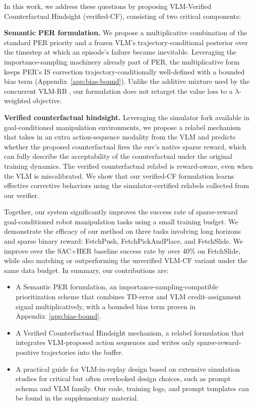 \documentclass{article}
\begin{document}
In this work, we address these questions by proposing VLM-Verified
Counterfactual Hindsight (verified-CF), consisting of two critical
components:

\textbf{Semantic PER formulation.}
We propose a multiplicative combination of the standard PER priority
and a frozen VLM's trajectory-conditional posterior over the
timestep at which an episode's failure became inevitable. Leveraging
the importance-sampling machinery already part of PER, the
multiplicative form keeps PER's IS correction trajectory-conditionally
well-defined with a bounded bias term
(Appendix~\ref{app:bias-bound}). Unlike the additive mixture used by
the concurrent VLM-RB \citep{sharony2026vlmrb}, our formulation does
not retarget the value loss to a $\lambda$-weighted objective.

\textbf{Verified counterfactual hindsight.}
Leveraging the simulator fork available in goal-conditioned
manipulation environments, we propose a relabel mechanism that takes
in an extra action-sequence modality from the VLM and predicts
whether the proposed counterfactual fires the env's native sparse
reward, which can fully describe the acceptability of the
counterfactual under the original training dynamics. The verified
counterfactual relabel is reward-aware, even when the VLM is
miscalibrated. We show that our verified-CF formulation learns
effective corrective behaviors using the simulator-certified
relabels collected from our verifier.

Together, our system significantly improves the success rate of
sparse-reward goal-conditioned robot manipulation tasks using a
small training budget. We demonstrate the efficacy of our method on
three tasks involving long horizons and sparse binary reward:
FetchPush, FetchPickAndPlace, and FetchSlide. We improve over the
SAC+HER baseline success rate by over 40\% on FetchSlide, while also
matching or outperforming the unverified VLM-CF variant under the
same data budget. In summary, our contributions are:
\begin{itemize}\itemsep0pt
\item A Semantic PER formulation, an importance-sampling-compatible
prioritization scheme that combines TD-error and VLM
credit-assignment signal multiplicatively, with a bounded bias term
proven in Appendix~\ref{app:bias-bound}.
\item A Verified Counterfactual Hindsight mechanism, a relabel
formulation that integrates VLM-proposed action sequences and writes
only sparse-reward-positive trajectories into the buffer.
\item A practical guide for VLM-in-replay design based on extensive
simulation studies for critical but often overlooked design choices,
such as prompt schema and VLM family. Our code, training logs, and
prompt templates can be found in the supplementary material.
\end{itemize}
\end{document}
